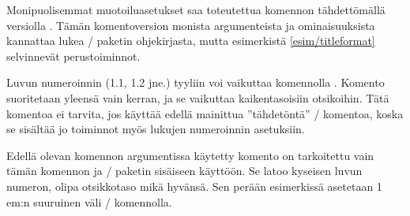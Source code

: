 \noindent
Monipuolisemmat muotoiluasetukset saa toteutettua komennon tähdettömällä
versiolla . Tämän komentoversion monista
argumenteista ja ominaisuuksista kannattaa lukea \-/
paketin ohjekirjasta, mutta esimerkistä \ref{esim/titleformat}
selvinnevät perustoiminnot.

\begin{esimerkki*}

\begin{koodilohko}
\titleformat{\section}     %
[hang]                     %
{\sffamily\bfseries\Large  %
  \raggedright}
{\thesection}              %
{.8em}                     %
{}                         %
[]                         %
\end{koodilohko}
  \caption{Otsikoiden ulkoasuun voi vaikuttaa monipuolisesti
    \-/ komennolla, joka kuuluu \-/
    pakettiin}
  \label{esim/titleformat}
\end{esimerkki*}

Luvun numeroinnin (1.1, 1.2 jne.) tyyliin voi vaikuttaa komennolla
. Komento suoritetaan yleensä vain kerran, ja se
vaikuttaa kaikentasoisiin otsikoihin. Tätä komentoa ei tarvita, jos
käyttää edellä mainittua ''tähdetöntä'' \-/
komentoa, koska se sisältää jo toiminnot myös lukujen numeroinnin
asetuksiin.

\begin{koodilohkosis}
\titlelabel{\thetitle\hspace{1em}}
\end{koodilohkosis}

\noindent
Edellä olevan komennon argumentissa käytetty komento 
on tarkoitettu vain tämän komennon ja \-/ paketin
sisäiseen käyttöön. Se latoo kyseisen luvun numeron, olipa otsikkotaso
mikä hyvänsä. Sen perään esimerkissä asetetaan 1\,em:n suuruinen väli
\-/ komennolla.

